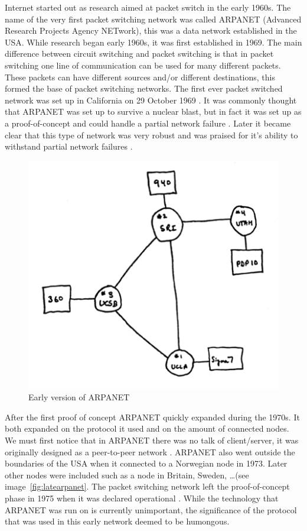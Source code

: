 Internet started out as research aimed at packet switch in the early 1960s. The name of the very first packet switching network was called ARPANET (Advanced Research Projects Agency NETwork), this was a data network established in the USA. While research began early 1960s, it was first established in 1969. The main difference between circuit switching and packet switching is that in packet switching one line of communication can be used for many different packets. These packets can have different sources and/or different destinations, this formed the base of packet switching networks. The first ever packet switched network was set up in California on 29 October 1969 \citep{petersalus1995}. It was commonly thought that ARPANET was set up to survive a nuclear blast, but in fact it was set up as a proof-of-concept and could handle a partial network failure \citep{katiehafner1998}. Later it became clear that this type of network was very robust and was praised for it's ability to withstand partial network failures \citep{janetabbate2000}.
\npar
\begin{figure}[H]
    \centering
    \includegraphics{figures/earlyarpanet}
    \caption{Early version of ARPANET \citep{pwp:rinaintro}} 
    \label{fig:earlyarpanet}
\end{figure}
\npar
After the first proof of concept ARPANET quickly expanded during the 1970s. It both expanded on the protocol it used and on the amount of connected nodes. We must first notice that in ARPANET there was no talk of client/server, it was originally designed as a peer-to-peer network \citep{petersalus2008, timbernerslee2000}. ARPANET also went outside the boundaries of the USA when it connected to a Norwegian node in 1973. Later other nodes were included such as a node in Britain, Sweden, \ldots (see image~\ref{fig:latearpanet}. The packet switching network left the proof-of-concept phase in 1975 when it was declared operational \citep{petersalus2008}. While the technology that ARPANET was run on is currently unimportant, the significance of the protocol that was used in this early network deemed to be humongous.  
